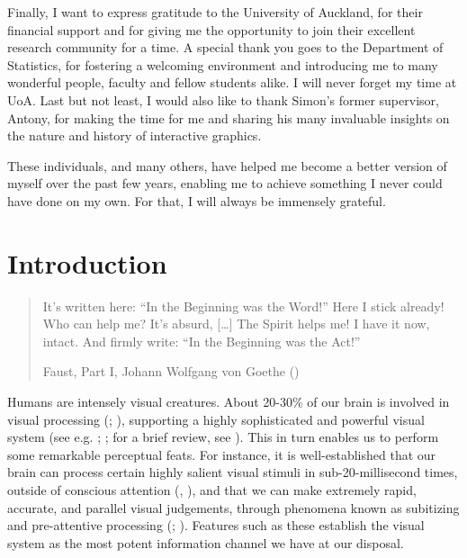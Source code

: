 \documentclass[
  openany]{book}
\theoremstyle{definition}
\theoremstyle{definition}
\theoremstyle{definition}
\theoremstyle{definition}
\theoremstyle{remark}
\begin{document}
Finally, I want to express gratitude to the University of Auckland, for their financial support and for giving me the opportunity to join their excellent research community for a time. A special thank you goes to the Department of Statistics, for fostering a welcoming environment and introducing me to many wonderful people, faculty and fellow students alike. I will never forget my time at UoA. Last but not least, I would also like to thank Simon's former supervisor, Antony, for making the time for me and sharing his many invaluable insights on the nature and history of interactive graphics.

These individuals, and many others, have helped me become a better version of myself over the past few years, enabling me to achieve something I never could have done on my own. For that, I will always be immensely grateful.

\tableofcontents

\mainmatter

\chapter{Introduction}\label{introduction}

\begin{quote}
It's written here: ``In the Beginning was the Word!''
Here I stick already! Who can help me? It's absurd,
{[}\ldots{]}
The Spirit helps me! I have it now, intact.
And firmly write: ``In the Beginning was the Act!''

Faust, Part I, Johann Wolfgang von Goethe ()
\end{quote}

Humans are intensely visual creatures. About 20-30\% of our brain is involved in visual processing (; ), supporting a highly sophisticated and powerful visual system (see e.g. ; ; for a brief review, see ). This in turn enables us to perform some remarkable perceptual feats. For instance, it is well-established that our brain can process certain highly salient visual stimuli in sub-20-millisecond times, outside of conscious attention (, ), and that we can make extremely rapid, accurate, and parallel visual judgements, through phenomena known as subitizing and pre-attentive processing (; ). Features such as these establish the visual system as the most potent information channel we have at our disposal.
\end{document}
